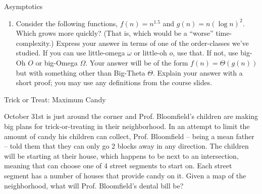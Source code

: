 \documentclass[10pt]{article}
\begin{document}
\thispagestyle{empty}
\handout


\begin{problem} Asymptotics \end{problem}
\begin{enumerate}
\item Consider the following functions, $f(n)=n^{1.5}$ and $g(n)=n (\log n)^2$. Which grows more quickly?  (That is, which would be a ``worse'' time-complexity.)  Express your answer in terms of one of the order-classes we've studied. If you can use little-omega $\omega$ or little-oh $o$, use that. If not, use big-Oh $O$ or big-Omega $\Omega$. Your answer will be of the form $f(n) = \Theta(g(n))$ but with something other than Big-Theta $\Theta$.  Explain your answer with a short proof; you may use any definitions from the course slides.
\end{enumerate}

\solution{
}


\begin{problem} Trick or Treat: Maximum Candy \end{problem}


October 31st is just around the corner and Prof. Bloomfield's children are making big plans for trick-or-treating in their neighborhood. In an attempt to limit the amount of candy his children can collect, Prof. Bloomfield -- being a mean father -- told them that they can only go 2 blocks away in any direction.  The children will be starting at their house, which happens to be next to an intersection, meaning that can choose one of 4 street segments to start on.  Each street segment has a number of houses that provide candy on it.  Given a map of the neighborhood, what will Prof. Bloomfield's dental bill be?
\end{document}
